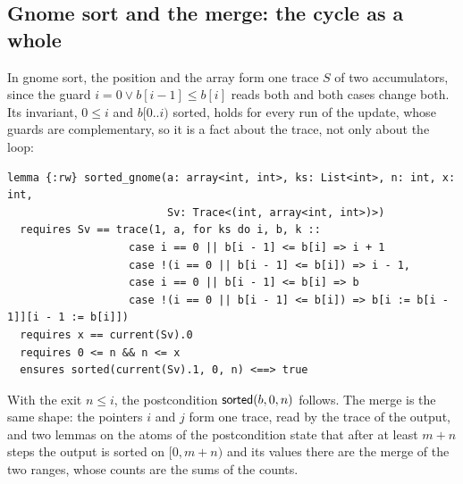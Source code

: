 \subsection{Gnome sort and the merge: the cycle as a whole}\label{sec:sorts:cycles}
In gnome sort, the position and the array form one trace $S$ of two accumulators, since the guard
$i = 0 \vee b[i - 1] \le b[i]$ reads both and both cases change both. Its invariant, $0 \le i$ and $b[0..i)$ sorted,
holds for every run of the update, whose guards are complementary, so it is a fact about the trace, not only about
the loop:
\begin{lstlisting}
lemma {:rw} sorted_gnome(a: array<int, int>, ks: List<int>, n: int, x: int,
                         Sv: Trace<(int, array<int, int>)>)
  requires Sv == trace(1, a, for ks do i, b, k ::
                   case i == 0 || b[i - 1] <= b[i] => i + 1
                   case !(i == 0 || b[i - 1] <= b[i]) => i - 1,
                   case i == 0 || b[i - 1] <= b[i] => b
                   case !(i == 0 || b[i - 1] <= b[i]) => b[i := b[i - 1]][i - 1 := b[i]])
  requires x == current(Sv).0
  requires 0 <= n && n <= x
  ensures sorted(current(Sv).1, 0, n) <==> true
\end{lstlisting}
With the exit $n \le i$, the postcondition $\mathsf{sorted}(b, 0, n)$ follows. The merge is the same shape: the pointers $i$
and $j$ form one trace, read by the trace of the output, and two lemmas on the atoms of the postcondition state
that after at least $m + n$ steps the output is sorted on $[0, m + n)$ and its values there are the merge of the two
ranges, whose counts are the sums of the counts.

